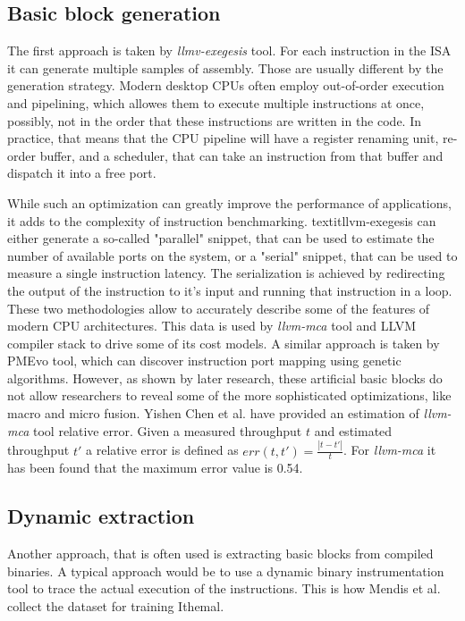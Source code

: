 \subsection{Basic block generation}

The first approach is taken by \textit{llmv-exegesis} tool. For each instruction in the ISA it can 
generate multiple samples of assembly. Those are usually different by the generation strategy. 
Modern desktop CPUs often employ out-of-order execution and pipelining, which allowes them to execute 
multiple instructions at once, possibly, not in the order that these instructions are written in the 
code. In practice, that means that the CPU pipeline will have a register renaming unit, re-order buffer, 
and a scheduler, that can take an instruction from that buffer and dispatch it into a free port.

While such an optimization can greatly improve the performance of applications, it adds to the complexity 
of instruction benchmarking. textit{llvm-exegesis} can either generate a so-called "parallel" snippet, 
that can be used to estimate the number of available ports on the system, or a "serial" snippet, 
that can be used to measure a single instruction latency. The serialization is achieved by redirecting 
the output of the instruction to it's input and running that instruction in a loop. These two 
methodologies allow to accurately describe some of the features of modern CPU architectures. 
This data is used by \textit{llvm-mca} tool and LLVM compiler stack to drive some of its cost models. 
A similar approach is taken by PMEvo tool, which can discover instruction port mapping using genetic 
algorithms\cite{ritterPMEvoPortableInference2020}. However, as shown by later research, these artificial 
basic blocks do not allow researchers to reveal some of the more sophisticated optimizations, like macro 
and micro fusion. Yishen Chen et al. \cite{chenBHiveBenchmarkSuite2019} have provided an estimation of 
\textit{llvm-mca} tool relative error. Given a measured throughput $t$ and estimated throughput $t'$ a 
relative error is defined as $err(t, t') = \frac{|t - t'|}{t}$. For \textit{llvm-mca} it has been found 
that the maximum error value is 0.54.

\subsection{Dynamic extraction}

Another approach, that is often used is extracting basic blocks from compiled binaries. A typical 
approach would be to use a dynamic binary instrumentation tool to trace the actual execution of the 
instructions. This is how Mendis et al. collect the dataset for training 
Ithemal\cite{mendisIthemalAccuratePortable2019}.

